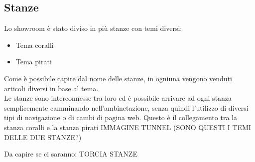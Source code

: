 \subsection{Stanze}
Lo showroom è stato diviso in più stanze con temi diversi:
\begin{itemize}
	\item Tema coralli
	\item Tema pirati
\end{itemize}
Come è possibile capire dal nome delle stanze, in ogniuna vengono venduti articoli diversi in base al tema.\\
Le stanze sono interconnesse tra loro ed è possibile arrivare ad ogni stanza semplicemente camminando nell'ambinetazione, senza quindi l'utilizzo di diversi tipi di navigazione o di cambi di pagina web.
Questo è il collegamento tra la stanza coralli e la stanza pirati
IMMAGINE TUNNEL (SONO QUESTI I TEMI DELLE DUE STANZE?)

\pagebreak




Da capire se ci saranno:
TORCIA
STANZE



